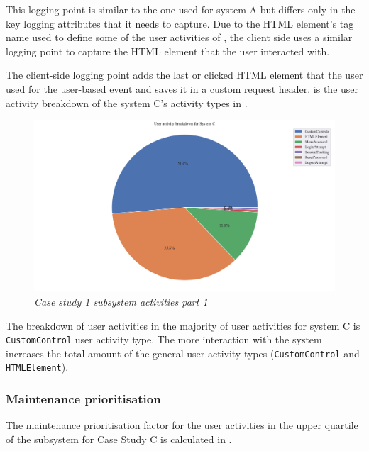 This logging point is similar to the one used for system A but differs only in the key logging attributes that it needs to capture. Due to the HTML element's tag name used to define some of the user activities of , the client side uses a similar logging point to capture the HTML element that the user interacted with.\par The client-side logging point adds the last or clicked HTML element that the user used for the user-based event and saves it in a custom request header.  is the user activity breakdown of the system C's activity types in .

\begin{figure}[!htb]
	\centering %
	\includegraphics[width=0.95\linewidth]{img/ch3/analysis/case_C_breakdown.pdf}
	\caption[Case study 1 subsystem activities part 1]
	{\textit{Case study 1 subsystem activities part 1}}\label{fig:ch3_caseCBreakdown}
\end{figure}

\clearpage

The breakdown of user activities in  the majority of user activities for system C is \texttt{CustomControl} user activity type. The more interaction with the system increases the total amount of the general user activity types (\texttt{CustomControl} and \texttt{HTMLElement}).

\subsubsection{Maintenance prioritisation}
The maintenance prioritisation factor for the user activities in the upper quartile of the subsystem for Case Study C is calculated in .

